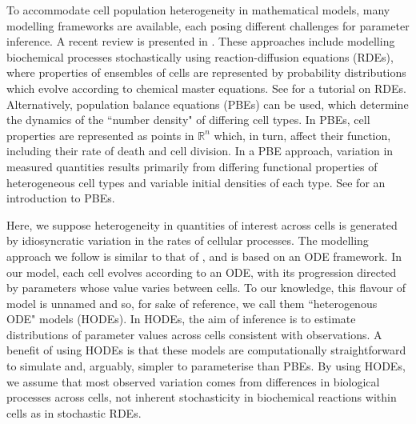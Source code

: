 To accommodate cell population heterogeneity in mathematical models, many modelling frameworks are available, each posing different challenges for parameter inference. A recent review is presented in \cite{waldherr2018estimation}. These approaches include modelling biochemical processes stochastically using reaction-diffusion equations (RDEs), where properties of ensembles of cells are represented by probability distributions which evolve according to chemical master equations. See \cite{erban2007practical} for a tutorial on RDEs. Alternatively, population balance equations (PBEs) can be used, which determine the dynamics of the ``number density" of differing cell types. In PBEs, cell properties are represented as points in $\mathbb{R}^n$ which, in turn, affect their function, including their rate of death and cell division. In a PBE approach, variation in measured quantities results primarily from differing functional properties of heterogeneous cell types and variable initial densities of each type. See \cite{ramkrishna2014population} for an introduction to PBEs.

Here, we suppose heterogeneity in quantities of interest across cells is generated by idiosyncratic variation in the rates of cellular processes. The modelling approach we follow is similar to that of \cite{dixit2018maximum}, and is based on an ODE framework. In our model, each cell evolves according to an ODE, with its progression directed by parameters whose value varies between cells. To our knowledge, this flavour of model is unnamed and so, for sake of reference, we call them ``heterogenous ODE" models (HODEs). In HODEs, the aim of inference is to estimate distributions of parameter values across cells consistent with observations. A benefit of using HODEs is that these models are computationally straightforward to simulate and, arguably, simpler to parameterise than PBEs. By using HODEs, we assume that most observed variation comes from differences in biological processes across cells, not inherent stochasticity in biochemical reactions within cells as in stochastic RDEs.

